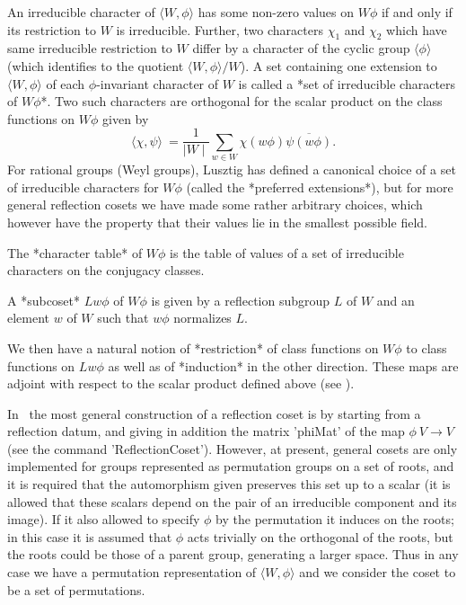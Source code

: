 An  irreducible  character  of  $\langle  W,\phi \rangle$ has some non-zero
values  on $W\phi$ if  and only if  its restriction to  $W$ is irreducible.
Further,  two characters $\chi_1$ and  $\chi_2$ which have same irreducible
restriction   to  $W$   differ  by   a  character   of  the   cyclic  group
$\langle\phi\rangle$  (which  identifies  to  the  quotient $\langle W,\phi
\rangle/W$).  A set containing one extension to $\langle W,\phi \rangle$ of
each  $\phi$-invariant character  of $W$  is called  a *set  of irreducible
characters  of $W\phi$*. Two such characters  are orthogonal for the scalar
product  on the  class functions  on $W\phi$  given by  $$\langle \chi,\psi
\rangle \:= \frac{1}{\mid W\mid}\sum_{w\in W}
\chi(w\phi)\overline{\psi(w\phi)}.$$  For  rational  groups  (Weyl groups),
Lusztig  has defined a canonical choice  of a set of irreducible characters
for  $W\phi$  (called  the  *preferred  extensions*),  but for more general
reflection cosets we have made some rather arbitrary choices, which however
have the property that their values lie in the smallest possible field.

The  *character  table*  of  $W\phi$  is  the  table  of values of a set of
irreducible characters on the conjugacy classes.

A  *subcoset* $Lw\phi$ of $W\phi$ is given  by a reflection subgroup $L$ of
$W$ and an element $w$ of $W$ such that $w\phi$ normalizes $L$.

We  then  have  a  natural  notion  of  *restriction* of class functions on
$W\phi$  to class functions  on $Lw\phi$ as  well as of  *induction* in the
other  direction. These maps are adjoint with respect to the scalar product
defined above (see \cite{BMM99}).

In  \CHEVIE\  the  most  general  construction  of a reflection coset is by
starting  from  a  reflection  datum,  and  giving  in  addition the matrix
'phiMat' of the map $\phi\:V\rightarrow V$ (see the command
'ReflectionCoset').   However,   at   present,   general  cosets  are  only
implemented for groups represented as permutation groups on a set of roots,
and  it is required that the automorphism  given preserves this set up to a
scalar  (it  is  allowed  that  these  scalars  depend  on  the  pair of an
irreducible  component and its image). If it also allowed to specify $\phi$
by the permutation it induces on the roots; in this case it is assumed that
$\phi$  acts trivially on the orthogonal of  the roots, but the roots could
be  those of a parent group, generating a larger space. Thus in any case we
have  a  permutation  representation  of  $\langle  W,\phi  \rangle$ and we
consider the coset to be a set of permutations.

